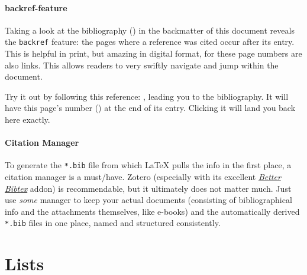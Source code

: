 \paragraph{backref-feature}
Taking a look at the bibliography () in the backmatter
of this document reveals the \texttt{backref} feature:
the pages where a reference was cited occur after its entry.
This is helpful in print, but amazing in digital format, for these page numbers
are also links.
This allows readers to very swiftly navigate and jump within the document.

Try it out by following this reference: \cite{diracPrinciplesQuantumMechanics1981},
leading you to the bibliography.
\label{backref_example}
It will have this page's number () at the end of its entry.
Clicking it will land you back here exactly.

\paragraph{Citation Manager}
To generate the \texttt{*.bib} file from which \LaTeX{} pulls the info in the
first place, a citation manager is a must\-/have.
Zotero
(especially with its excellent \href{https://retorque.re/zotero-better-bibtex/}{\emph{Better Bibtex}} addon)
is recommendable, but it ultimately does not matter much.
Just use \emph{some} manager to keep your actual documents
(consisting of bibliographical info and the attachments themselves, like e-books)
and the automatically derived \texttt{*.bib} files in one place,
named and structured consistently.

\section{Lists}


